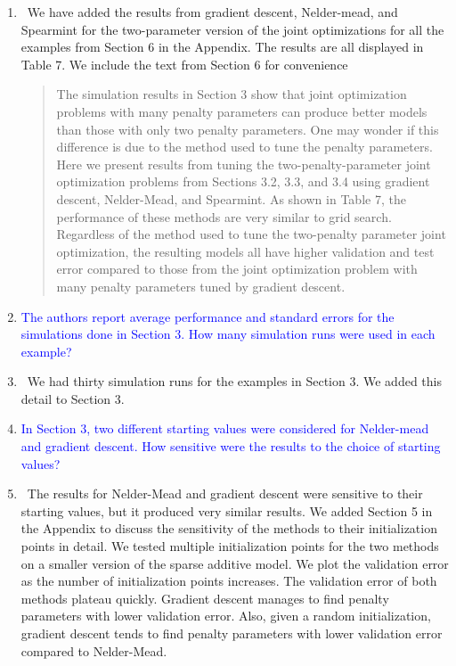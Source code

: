 \documentclass[]{article}
\newcommand{\point}[1]{\item \textcolor{blue}{#1}}
\newcommand{\reply}{\item[]\ }
\begin{document}
\begin{enumerate}
		\reply We have added the results from gradient descent, Nelder-mead, and Spearmint for the two-parameter version of the joint optimizations for all the examples from Section 6 in the Appendix. The results are all displayed in Table 7. We include the text from Section 6 for convenience
		
		\begin{quote}
			The simulation results in Section 3 show that joint optimization problems with many penalty parameters can produce better models than those with only two penalty parameters. One may wonder if this difference is due to the method used to tune the penalty parameters. Here we present results from tuning the two-penalty-parameter joint optimization problems from Sections 3.2, 3.3, and 3.4 using gradient descent, Nelder-Mead, and Spearmint. As shown in Table 7, the performance of these methods are very similar to grid search. Regardless of the method used to tune the two-penalty parameter joint optimization, the resulting models all have higher validation and test error compared to those from the joint optimization problem with many penalty parameters tuned by gradient descent.
		\end{quote}
		
		\point{The authors report average performance and standard errors for the simulations done in Section 3. How many simulation runs were used in each example?}
		
		\reply We had thirty simulation runs for the examples in Section 3. We added this detail to Section 3.
				
		\point{In Section 3, two different starting values were considered for Nelder-mead and gradient descent. How sensitive were the results to the choice of starting values?}
		
		\reply The results for Nelder-Mead and gradient descent were sensitive to their starting values, but it produced very similar results. We added Section 5 in the Appendix to discuss the sensitivity of the methods to their initialization points in detail. We tested multiple initialization points for the two methods on a smaller version of the sparse additive model. We plot the validation error as the number of initialization points increases. The validation error of both methods plateau quickly. Gradient descent manages to find penalty parameters with lower validation error. Also, given a random initialization, gradient descent tends to find penalty parameters with lower validation error compared to Nelder-Mead.
		

\end{enumerate}
\end{document}
